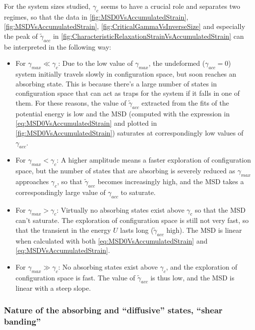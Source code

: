 For the system sizes studied, $\gamma_{c}$ seems to have a crucial role and separates two regimes, so that the data in \autoref{fig:MSD0VsAccumulatedStrain}, \ref{fig:MSDVsAccumulatedStrain}, \ref{fig:CriticalGammaVsInverseSize} and especially the peak of $\widetilde{\gamma}_{acc}$ in \autoref{fig:CharacteristicRelaxationStrainVsAccumulatedStrain} can be interpreted in the following way:
\begin{itemize}
	\item For $\gamma_{max} \ll \gamma_{c}$: Due to the low value of $\gamma_{max}$, the undeformed ($\gamma_{acc} = 0$) system initially travels slowly in configuration space, but soon reaches an absorbing state. This is because there's a large number of states in configuration space that can act as traps for the system if it falls in one of them. For these reasons, the value of $\widetilde{\gamma}_{acc}$ extracted from the fits of the potential energy is low and the MSD (computed with the expression in \autoref{eq:MSD0VsAccumulatedStrain} and plotted in \autoref{fig:MSD0VsAccumulatedStrain}) saturates at correspondingly low values of $\gamma_{acc}$.
	\item For $\gamma_{max} < \gamma_{c}$: A higher amplitude means a faster exploration of configuration space, but the number of states that are absorbing is severely reduced as $\gamma_{max}$ approaches $\gamma_{c}$, so that $\widetilde{\gamma}_{acc}$ becomes increasingly high, and the MSD takes a correspondingly large value of $\gamma_{acc}$ to saturate. 
	\item For $\gamma_{max} > \gamma_{c}$: Virtually no absorbing states exist above $\gamma_{c}$ so that the MSD can't saturate. The exploration of configuration space is still not very fast, so that the transient in the energy $U$ lasts long ($\widetilde{\gamma}_{acc}$ high). The MSD is linear when calculated with both \autoref{eq:MSD0VsAccumulatedStrain} and \autoref{eq:MSDVsAccumulatedStrain}.
	\item For $\gamma_{max} \gg \gamma_{c}$: No absorbing states exist above $\gamma_{c}$, and the exploration of configuration space is fast. The value of $\widetilde{\gamma}_{acc}$ is thus low, and the MSD is linear with a steep slope.
\end{itemize}

\subsubsection{Nature of the absorbing and ``diffusive'' states, ``shear banding''}

